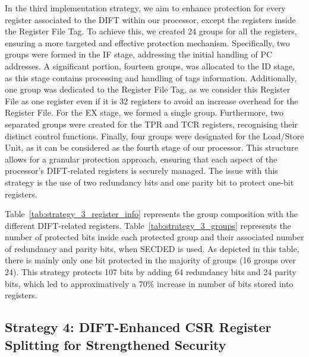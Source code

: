 In the third implementation strategy, we aim to enhance protection for every register associated to the DIFT within our processor, except the registers inside the Register File Tag. To achieve this, we created 24 groups for all the registers, ensuring a more targeted and effective protection mechanism. Specifically, two groups were formed in the IF stage, addressing the initial handling of PC addresses. A significant portion, fourteen groups, was allocated to the ID stage, as this stage contains processing and handling of tags information. Additionally, one group was dedicated to the Register File Tag, as we consider this Register File as one register even if it is 32 registers to avoid an increase overhead for the Register File. For the EX stage, we formed a single group. Furthermore, two separated groups were created for the TPR and TCR registers, recognising their distinct control functions. Finally, four groups were designated for the Load/Store Unit, as it can be considered as the fourth stage of our processor. This structure allows for a granular protection approach, ensuring that each aspect of the processor's DIFT-related registers is securely managed. The issue with this strategy is the use of two redundancy bits and one parity bit to protect one-bit registers.

Table~\ref{tab:strategy_3_register_info} represents the group composition with the different DIFT-related registers.
Table~\ref{tab:strategy_3_groups} represents the number of protected bits inside each protected group and their associated number of redundancy and parity bits, when SECDED is used. As depicted in this table, there is mainly only one bit protected in the majority of groups (16 groups over 24). This strategy protects 107 bits by adding 64 redundancy bits and 24 parity bits, which led to approximatively a 70\% increase in number of bits stored into registers.

\subsection{Strategy 4: DIFT-Enhanced CSR Register Splitting for Strengthened Security}

